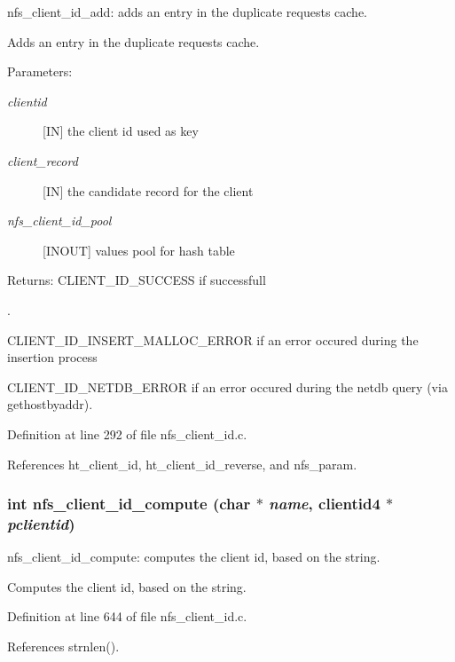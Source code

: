 nfs\_\-client\_\-id\_\-add: adds an entry in the duplicate requests cache.

Adds an entry in the duplicate requests cache.

\begin{Desc}
\item[Parameters:]
\begin{description}
\item[{\em clientid}][IN] the client id used as key \item[{\em client\_\-record}][IN] the candidate record for the client \item[{\em nfs\_\-client\_\-id\_\-pool}][INOUT] values pool for hash table\end{description}
\end{Desc}
\begin{Desc}
\item[Returns:]CLIENT\_\-ID\_\-SUCCESS if successfull\par
. 

CLIENT\_\-ID\_\-INSERT\_\-MALLOC\_\-ERROR if an error occured during the insertion process \par
 

CLIENT\_\-ID\_\-NETDB\_\-ERROR if an error occured during the netdb query (via gethostbyaddr). \end{Desc}


Definition at line 292 of file nfs\_\-client\_\-id.c.

References ht\_\-client\_\-id, ht\_\-client\_\-id\_\-reverse, and nfs\_\-param.
\subsubsection{\setlength{\rightskip}{0pt plus 5cm}int nfs\_\-client\_\-id\_\-compute (char $\ast$ {\em name}, clientid4 $\ast$ {\em pclientid})}\label{nfs__client__id_8c_a20}


nfs\_\-client\_\-id\_\-compute: computes the client id, based on the string.

Computes the client id, based on the string. 

Definition at line 644 of file nfs\_\-client\_\-id.c.

References strnlen().
